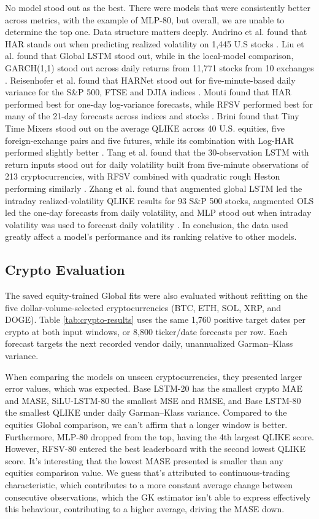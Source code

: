 \documentclass[12pt,a4paper]{article}
\numberwithin{equation}{section}
\numberwithin{table}{section}
\numberwithin{figure}{section}
\begin{document}
No model stood out as the best. There were models that were consistently better across metrics, with the example of MLP-80, but overall, we are unable to determine the top one. Data structure matters deeply. Audrino et al. found that HAR stands out when predicting realized volatility on 1,445 U.S stocks \cite{audrino2024}. Liu et al. found that Global LSTM stood out, while in the local-model comparison, GARCH(1,1) stood out across daily returns from 11,771 stocks from 10 exchanges \cite{liu2023}. Reisenhofer et al. found that HARNet stood out for five-minute-based daily variance for the S\&P 500, FTSE and DJIA indices \cite{reisenhofer2022}. Mouti found that HAR performed best for one-day log-variance forecasts, while RFSV performed best for many of the 21-day forecasts across indices and stocks \cite{mouti2023}. Brini found that Tiny Time Mixers stood out on the average QLIKE across 40 U.S. equities, five foreign-exchange pairs and five futures, while its combination with Log-HAR performed slightly better \cite{brini2026}. Tang et al. found that the 30-observation LSTM with return inputs stood out for daily volatility built from five-minute observations of 213 cryptocurrencies, with RFSV combined with quadratic rough Heston performing similarly \cite{tang2023}. Zhang et al. found that augmented global LSTM led the intraday realized-volatility QLIKE results for 93 S\&P 500 stocks, augmented OLS led the one-day forecasts from daily volatility, and MLP stood out when intraday volatility was used to forecast daily volatility \cite{zhang2022}. In conclusion, the data used greatly affect a model's performance and its ranking relative to other models.

\subsection{Crypto Evaluation}
The saved equity-trained Global fits were also evaluated without refitting on the five dollar-volume-selected cryptocurrencies (BTC, ETH, SOL, XRP, and DOGE). Table \ref{tab:crypto-results} uses the same 1,760 positive target dates per crypto at both input windows, or 8,800 ticker/date forecasts per row. Each forecast targets the next recorded vendor daily, unannualized Garman--Klass variance. 

When comparing the models on unseen cryptocurrencies, they presented larger error values, which was expected. Base LSTM-20 has the smallest crypto MAE and MASE, SiLU-LSTM-80 the smallest MSE and RMSE, and Base LSTM-80 the smallest QLIKE under daily Garman--Klass variance. Compared to the equities Global comparison, we can't affirm that a longer window is better. Furthermore, MLP-80 dropped from the top, having the 4th largest QLIKE score. However, RFSV-80 entered the best leaderboard with the second lowest QLIKE score. It's interesting that the lowest MASE presented is smaller than any equities comparison value. We guess that's attributed to continuous-trading characteristic, which contributes to a more constant average change between consecutive observations, which the GK estimator isn't able to express effectively this behaviour, contributing to a higher average, driving the MASE down.
\end{document}
